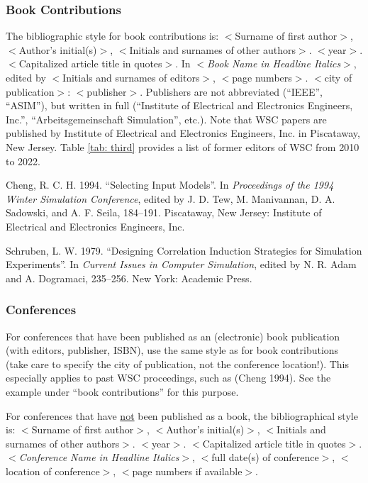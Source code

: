 \documentclass{wscpaperproc}
\theoremstyle{wsc}
\begin{document}
\subsubsection{Book Contributions}
The bibliographic style for book contributions is: 
$<$Surname of first author$>$, $<$Author’s initial(s)$>$, $<$Initials and surnames of other authors$>$. $<$year$>$. 
$<$Capitalized article title in quotes$>$. In $<${\em Book Name in Headline Italics}$>$, 
edited by $<$Initials and surnames of editors$>$, $<$page numbers$>$. $<$city of publication$>$: $<$publisher$>$.
Publishers are not abbreviated (``IEEE'', ``ASIM''), but written in full (``Institute of Electrical and Electronics Engineers, Inc.'', ``Arbeitsgemeinschaft Simulation'', etc.). Note that WSC papers are published by Institute of Electrical and Electronics Engineers, Inc. in Piscataway, New Jersey. Table \ref{tab: third} provides a list of former editors of WSC from 2010 to 2022. 

{\footnotesize
\begin{hangref}
\item Cheng, R. C. H. 1994. ``Selecting Input Models''. In \textit{Proceedings of the 1994 Winter Simulation Conference}, edited by J. D. Tew, M. Manivannan, D. A. Sadowski, and A. F. Seila, 184–191. Piscataway, New Jersey: Institute of Electrical and Electronics Engineers, Inc. 
\item Schruben, L. W. 1979. ``Designing Correlation Induction Strategies for Simulation Experiments''. In \textit{Current Issues in Computer Simulation}, edited by N. R. Adam and A. Dogramaci, 235–256. New York: Academic Press.
\end{hangref}
}

\subsubsection{Conferences}
For conferences that have been published as an (electronic) book publication (with editors, publisher, ISBN),
use the same style as for book contributions (take care to specify the city of publication, not the conference location!). 
This especially applies to past WSC proceedings, such as (Cheng 1994). See the example under ``book contributions'' for this purpose.

For conferences that have \underline{not} been published as a book, the bibliographical style is: 
$<$Surname of first author$>$, $<$Author’s initial(s)$>$, $<$Initials and surnames of other authors$>$. $<$year$>$. 
$<$Capitalized article title in quotes$>$. $<${\em Conference Name in Headline Italics}$>$, $<$full date(s) of conference$>$, 
$<$location of conference$>$, $<$page numbers if available$>$.
\end{document}
